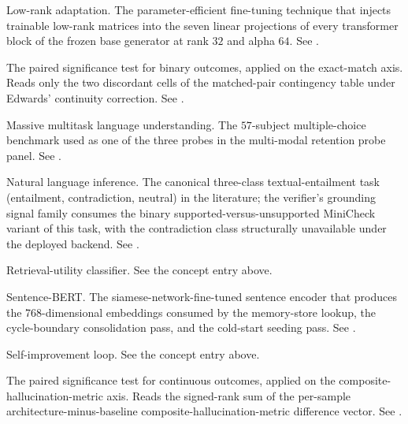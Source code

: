 \begin{description}[style=nextline, leftmargin=0pt, labelindent=0pt, itemsep=6pt, parsep=0pt, font=\bfseries, beginpenalty=10000]
\item[LoRA:] Low-rank adaptation. The parameter-efficient fine-tuning technique that injects trainable low-rank matrices into the seven linear projections of every transformer block of the frozen base generator at rank $32$ and alpha $64$. See .

\item[McNemar test:] The paired significance test for binary outcomes, applied on the exact-match axis. Reads only the two discordant cells of the matched-pair contingency table under Edwards' continuity correction. See .

\item[MMLU:] Massive multitask language understanding. The $57$-subject multiple-choice benchmark used as one of the three probes in the multi-modal retention probe panel. See .

\item[NLI:] Natural language inference. The canonical three-class textual-entailment task (entailment, contradiction, neutral) in the literature; the verifier's grounding signal family consumes the binary supported-versus-unsupported MiniCheck variant of this task, with the contradiction class structurally unavailable under the deployed backend. See .

\item[RUC:] Retrieval-utility classifier. See the concept entry above.

\item[SBERT:] Sentence-BERT. The siamese-network-fine-tuned sentence encoder that produces the 768-dimensional embeddings consumed by the memory-store lookup, the cycle-boundary consolidation pass, and the cold-start seeding pass. See .

\item[SIL:] Self-improvement loop. See the concept entry above.

\item[Wilcoxon signed-rank:] The paired significance test for continuous outcomes, applied on the composite-hallucination-metric axis. Reads the signed-rank sum of the per-sample architecture-minus-baseline composite-hallucination-metric difference vector. See .

\end{description}
